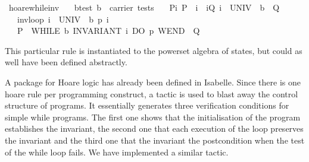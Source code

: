\documentclass{llncs}
\begin{document}
\begin{isabellebody}
\isamarkupfalse%
\ hoare{}while{}inv{}\isanewline
\ \ \ b{}test{}\ {}b\ {}\ carrier\ tests{}\isanewline
\ \ \ Pi{}\ {}P\ {}\ i{}\ \ iQ{}\ {}i\ {}\ {}UNIV\ {}\ {}b{}\ {}\ Q{}\isanewline
\ \ \ inv{}loop{}\ {}i\ {}\ {}UNIV\ {}\ b{}\ {}p{}\ i{}\isanewline
\ \ \ {}P\ {}\ WHILE\ b\ INVARIANT\ i\ DO\ p\ WEND\ {}\ Q{}\isanewline
\end{isabellebody}

This particular rule is instantiated to the powerset algebra of
states, but could as well have been defined abstractly.

A package for Hoare logic has already been defined in Isabelle. Since
there is one hoare rule per programming construct, a tactic is used to
blast away the control structure of programs. It essentially generates
three verification conditions for simple while programs. The first one
shows that the initialisation of the program establishes the
invariant, the second one that each execution of the loop preserves
the invariant and the third one that the invariant the postcondition
when the test of the while loop fails. We have implemented a
similar tactic.
\end{document}
